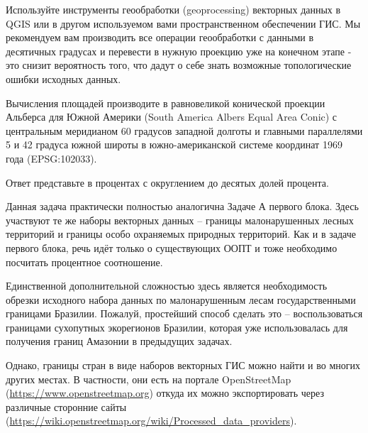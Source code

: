 Используйте инструменты геообработки (geoprocessing) векторных данных в \linebreak QGIS или в другом используемом вами пространственном обеспечении ГИС.  Мы рекомендуем вам производить все операции геообработки с данными в десятичных градусах и перевести в нужную проекцию уже на конечном этапе - это снизит вероятность того, что дадут о себе знать возможные топологические ошибки исходных данных.

Вычисления площадей производите в равновеликой конической проекции Альберса для Южной Америки (South America Albers Equal Area Conic) с центральным меридианом 60 градусов западной долготы и главными параллелями 5 и 42 градуса южной широты в южно-американской системе координат 1969 года (EPSG:102033).

Ответ представьте в процентах с округлением до десятых долей процента.

\explanationSection

Данная задача практически полностью аналогична Задаче А первого блока. Здесь участвуют те же наборы векторных данных – границы малонарушенных лесных территорий и границы особо охраняемых природных территорий. Как и в задаче первого блока, речь идёт только о существующих ООПТ и тоже необходимо посчитать процентное соотношение.

Единственной дополнительной сложностью здесь является необходимость обрезки исходного набора данных по малонарушенным лесам государственными границами Бразилии. Пожалуй, простейший способ сделать это – воспользоваться границами сухопутных экорегионов Бразилии, которая уже использовалась для получения границ Амазонии в предыдущих задачах.

Однако, границы стран в виде наборов векторных ГИС можно найти и во многих других местах. В частности, они есть на портале OpenStreetMap (\url{https://www.openstreetmap.org}) откуда их можно экспортировать через различные сторонние сайты
(\url{https://wiki.openstreetmap.org/wiki/Processed_data_providers}).

